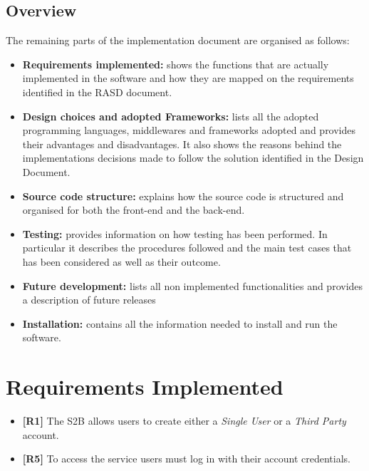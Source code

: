 \documentclass[titlepage]{article}
\begin{document}
	\subsection{Overview}
	The remaining parts of the implementation document are organised as follows:
	\begin{itemize}
		\item {\bf Requirements implemented:}
		shows the functions that are actually implemented in the software and how they are mapped on the requirements identified in the RASD document.
		
		\item {\bf Design choices and adopted Frameworks:}
		lists all the adopted programming languages, middlewares and frameworks adopted and provides their advantages and disadvantages. It also shows the reasons behind the implementations decisions made to follow the solution identified in the Design Document.
		
		\item {\bf Source code structure:}
		explains how the source code is structured and organised for both the front-end and the back-end.
		
		\item {\bf Testing:}
		provides information on how testing has been performed. In particular it describes the procedures followed and the main test cases that has been considered as well as their outcome.
		
		\item{\bf Future development:}
		lists all non implemented functionalities and provides a description of future releases
		
		\item {\bf Installation:}
		contains all the information needed to install and run the software.
	\end{itemize}
	
	
	\pagebreak
	\section{Requirements Implemented}
	\begin{itemize}
		\item {\bf [R1]} The S2B allows users to create either a {\it Single User} or a {\it Third Party} account. 
		\item {\bf [R5]} To access the service users must log in with their account credentials.
	\end{itemize}	
	
\end{document}

